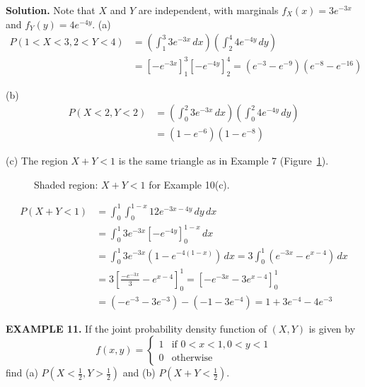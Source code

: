 \documentclass{article}
\begin{document}
\textbf{Solution.} Note that $X$ and $Y$ are independent, with marginals $f_X(x) = 3e^{-3x}$ and $f_Y(y) = 4e^{-4y}$.
(a)
\begin{align*}
P(1 < X < 3, 2 < Y < 4) &= \left( \int_{1}^{3} 3e^{-3x} \,dx \right) \left( \int_{2}^{4} 4e^{-4y} \,dy \right) \\
&= \left[ -e^{-3x} \right]_{1}^{3} \left[ -e^{-4y} \right]_{2}^{4} = (e^{-3} - e^{-9})(e^{-8} - e^{-16})
\end{align*}

(b) 
\begin{align*}
P(X < 2, Y < 2) &= \left( \int_{0}^{2} 3e^{-3x} \,dx \right) \left( \int_{0}^{2} 4e^{-4y} \,dy \right) \\
&= (1 - e^{-6})(1 - e^{-8})
\end{align*}

(c) The region $X+Y<1$ is the same triangle as in Example 7 (Figure~\ref{fig:ex10c}).
\begin{figure}[H]
\centering
{}
\caption{Shaded region: $X+Y<1$ for Example 10(c).}
\label{fig:ex10c}
\end{figure}
\begin{align*}
P(X+Y < 1) &= \int_{0}^{1} \int_{0}^{1-x} 12e^{-3x-4y} \,dy \,dx \\
&= \int_{0}^{1} 3e^{-3x} \left[ -e^{-4y} \right]_{0}^{1-x} \,dx \\
&= \int_{0}^{1} 3e^{-3x} (1 - e^{-4(1-x)}) \,dx = 3 \int_{0}^{1} (e^{-3x} - e^{x-4}) \,dx \\
&= 3 \left[ \frac{-e^{-3x}}{3} - e^{x-4} \right]_{0}^{1} = \left[ -e^{-3x} - 3e^{x-4} \right]_{0}^{1} \\
&= (-e^{-3} - 3e^{-3}) - (-1 - 3e^{-4}) = 1 + 3e^{-4} - 4e^{-3}
\end{align*}

\vspace{1em}

\textbf{EXAMPLE 11.} If the joint probability density function of $(X,Y)$ is given by
$$
f(x, y) = \begin{cases} 1 & \text{if } 0 < x < 1, 0 < y < 1 \\ 0 & \text{otherwise} \end{cases}
$$
find (a) $P(X < \frac{1}{2}, Y > \frac{1}{2})$ and (b) $P(X +Y < \frac{1}{2})$.
\end{document}
